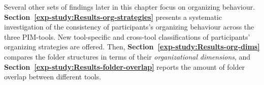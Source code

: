 Several other sets of findings later in this chapter focus on organizing behaviour.   \textbf{Section~\ref{exp-study:Results-org-strategies}} presents a systematic investigation of the consistency of participants's organizing behaviour across the three PIM-tools.  New tool-specific and cross-tool classifications of participants' organizing strategies are offered. 
Then, \textbf{Section~\ref{exp-study:Results-org-dims}} compares the folder structures in terms of their \textit{organizational dimensions}, and \textbf{Section~\ref{exp-study:Results-folder-overlap}} reports the amount of folder overlap between different tools. 






